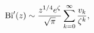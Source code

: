 \[\mathop{\mathrm{Bi}\/}\nolimits'\!\left(z\right)\sim\frac{z^{1/4}e^{\zeta}}{%
\sqrt{\pi}}\sum_{k=0}^{\infty}\frac{v_{k}}{\zeta^{k}},\]